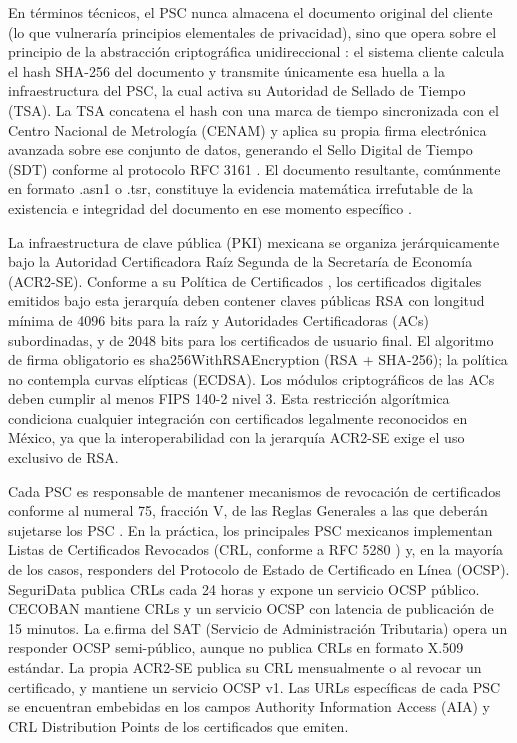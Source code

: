 En términos técnicos, el PSC nunca almacena el documento original del cliente (lo que vulneraría principios elementales de privacidad), sino que opera sobre el principio de la abstracción criptográfica unidireccional \cite{mifiel2024}: el sistema cliente calcula el hash SHA-256 del documento y transmite únicamente esa huella a la infraestructura del PSC, la cual activa su Autoridad de Sellado de Tiempo (TSA). La TSA concatena el hash con una marca de tiempo sincronizada con el Centro Nacional de Metrología (CENAM) y aplica su propia firma electrónica avanzada sobre ese conjunto de datos, generando el Sello Digital de Tiempo (SDT) conforme al protocolo RFC 3161 \cite{mifiel2024}. El documento resultante, comúnmente en formato .asn1 o .tsr, constituye la evidencia matemática irrefutable de la existencia e integridad del documento en ese momento específico \cite{mifiel2024}.

La infraestructura de clave pública (PKI) mexicana se organiza jerárquicamente bajo la Autoridad Certificadora Raíz Segunda de la Secretaría de Economía (ACR2-SE). Conforme a su Política de Certificados \cite{economia_acr2se}, los certificados digitales emitidos bajo esta jerarquía deben contener claves públicas RSA con longitud mínima de 4096 bits para la raíz y Autoridades Certificadoras (ACs) subordinadas, y de 2048 bits para los certificados de usuario final. El algoritmo de firma obligatorio es sha256WithRSAEncryption (RSA + SHA-256); la política no contempla curvas elípticas (ECDSA). Los módulos criptográficos de las ACs deben cumplir al menos FIPS 140-2 nivel 3. Esta restricción algorítmica condiciona cualquier integración con certificados legalmente reconocidos en México, ya que la interoperabilidad con la jerarquía ACR2-SE exige el uso exclusivo de RSA.

Cada PSC es responsable de mantener mecanismos de revocación de certificados conforme al numeral 75, fracción V, de las Reglas Generales a las que deberán sujetarse los PSC \cite{regccompsc}. En la práctica, los principales PSC mexicanos implementan Listas de Certificados Revocados (CRL, conforme a RFC 5280 \cite{cooper2008}) y, en la mayoría de los casos, responders del Protocolo de Estado de Certificado en Línea (OCSP). SeguriData \cite{seguridata} publica CRLs cada 24 horas y expone un servicio OCSP público. CECOBAN \cite{cecoban} mantiene CRLs y un servicio OCSP con latencia de publicación de 15 minutos. La e.firma del SAT (Servicio de Administración Tributaria) opera un responder OCSP semi-público, aunque no publica CRLs en formato X.509 estándar. La propia ACR2-SE publica su CRL mensualmente o al revocar un certificado, y mantiene un servicio OCSP v1. Las URLs específicas de cada PSC se encuentran embebidas en los campos Authority Information Access (AIA) y CRL Distribution Points de los certificados que emiten.

